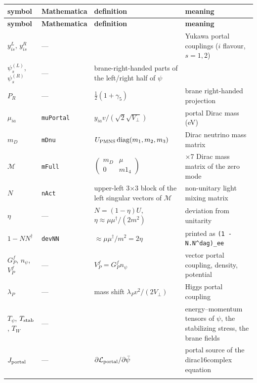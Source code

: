 \documentclass[10pt,a4paper]{article}
\begin{document}
{\small
\begin{longtable}{>{\raggedright\arraybackslash}p{}>{\raggedright\arraybackslash}p{}>{\raggedright\arraybackslash}p{}>{\raggedright\arraybackslash}p{}}
\toprule
\textbf{symbol} & \textbf{Mathematica} & \textbf{definition} & \textbf{meaning} \\
\midrule\endfirsthead
\toprule
\textbf{symbol} & \textbf{Mathematica} & \textbf{definition} & \textbf{meaning} \\
\midrule\endhead
\endfoot
\bottomrule\endlastfoot
$y^L_{is}$, $y^R_{is}$ & — &  & Yukawa portal couplings ($i$ flavour, $s=1,2$) \\
$\psi^{(L)}_s$, $\psi^{(R)}_s$ & — & brane-right-handed parts of the left/right half of $\psi$ &  \\
$P_R$ & — & $\frac12(1+\gamma_5)$ & brane right-handed projection \\
$\mu_{ia}$ & \texttt{muPortal} & $y_{ia}v/(\sqrt2\sqrt{V_\perp})$ & portal Dirac mass (eV) \\
$m_D$ & \texttt{mDnu} & $U_{\rm PMNS}\,\mathrm{diag}(m_1,m_2,m_3)$ & Dirac neutrino mass matrix \\
$\mathcal M$ & \texttt{mFull} & $\begin{pmatrix}m_D&\mu\\0&m1_4\end{pmatrix}$ & 7×7 Dirac mass matrix of the zero mode \\
$N$ & \texttt{nAct} & upper-left 3×3 block of the left singular vectors of $\mathcal M$ & non-unitary light mixing matrix \\
$\eta$ & — & $N=(1-\eta)U$, $\eta\approx\mu\mu^\dagger/(2m^2)$ & deviation from unitarity \\
$1-NN^\dagger$ & \texttt{devNN} & $\approx\mu\mu^\dagger/m^2=2\eta$ & printed as \texttt{(1 - N.N\textasciicircum{}dag)\_\allowbreak{}ee} \\
$G^f_P$, $n_\psi$, $V^f_P$ & — & $V^f_P=G^f_Pn_\psi$ & vector portal coupling, density, potential \\
$\lambda_P$ & — & mass shift $\lambda_Pv^2/(2V_\perp)$ & Higgs portal coupling \\
$T_\psi$, $T_{\rm stab}$, $T_W$ & — &  & energy–momentum tensors of $\psi$, the stabilizing stress, the brane fields \\
$J_{\rm portal}$ & — & $\partial\mathcal L_{\rm portal}/\partial\bar\psi$ & portal source of the dirac16complex equation \\*
\end{longtable}}
\end{document}
